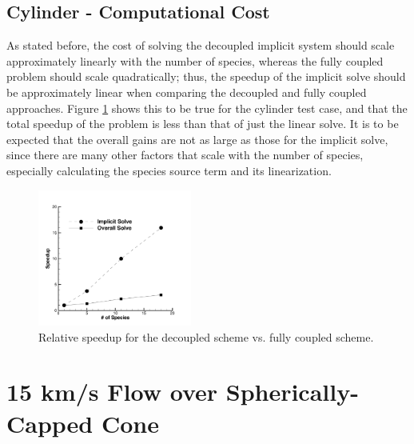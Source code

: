 \subsection{Cylinder - Computational Cost}

As stated before, the cost of solving the decoupled implicit system should scale
approximately linearly with the number of species, whereas the fully coupled
problem should scale quadratically; thus, the speedup of the implicit solve
should be approximately linear when comparing the decoupled and fully coupled
approaches.  Figure \ref{rel_speedup} shows this to be true for the cylinder test
case, and that the total speedup of the problem is less than that of just
the linear solve.  It is to be expected that the overall gains are not as large
as those for the implicit solve, since there are many other factors that
scale with the number of species, especially calculating the species source term
and its linearization.

\begin{figure}[h]
  \centering
  \includegraphics[width=0.45\textwidth]{figures/scitech/speedup} 
  \caption{ Relative speedup for the decoupled scheme vs. fully coupled scheme.}
  \label{rel_speedup} 
\end{figure}

\section{15 km/s Flow over Spherically-Capped Cone}
\label{sec:15-kps-sphere-cone}


